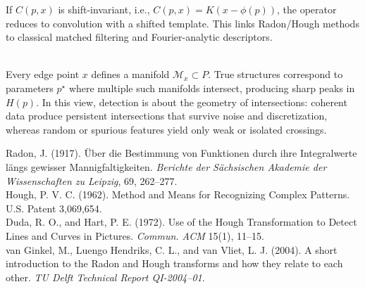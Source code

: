 \begin{technical}
If $C(p,x)$ is shift-invariant, i.e., $C(p,x) = K(x - \phi(p))$, the operator reduces to convolution with a shifted template. This links Radon/Hough methods to classical matched filtering and Fourier-analytic descriptors.


\\[0.5em]
Every edge point $x$ defines a manifold $\mathcal{M}_x \subset P$. True structures correspond to parameters $p^\star$ where multiple such manifolds intersect, producing sharp peaks in $H(p)$. In this view, detection is about the geometry of intersections: coherent data produce persistent intersections that survive noise and discretization, whereas random or spurious features yield only weak or isolated crossings.


\techref
{\footnotesize
Radon, J. (1917). \"Uber die Bestimmung von Funktionen durch ihre Integralwerte l\"angs gewisser Mannigfaltigkeiten. \textit{Berichte der S\"achsischen Akademie der Wissenschaften zu Leipzig}, 69, 262–277.\\
Hough, P. V. C. (1962). Method and Means for Recognizing Complex Patterns. U.S. Patent 3,069,654.\\
Duda, R. O., and Hart, P. E. (1972). Use of the Hough Transformation to Detect Lines and Curves in Pictures. \textit{Commun. ACM} 15(1), 11–15.\\
van Ginkel, M., Luengo Hendriks, C. L., and van Vliet, L. J. (2004). A short introduction to the Radon and Hough transforms and how they relate to each other. \textit{TU Delft Technical Report QI-2004–01}.
}
\end{technical}



